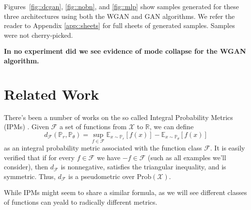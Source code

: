 \documentclass{article} %
\newcommand\EE{\mathbb{E}}
\newcommand\PP{\mathbb{P}}
\newcommand\RR{\mathbb{R}}
\theoremstyle{definition}
\theoremstyle{definition}
\newcommand\manX{\mathcal{X}}
\newcommand\manF{\mathcal{F}}
\begin{document}
Figures~\ref{fig::dcgan}, \ref{fig::nobn}, and \ref{fig::mlp} show
samples generated for these three architectures using both the WGAN
and GAN algorithms. We refer the reader to Appendix
\autoref{app::sheets} for full sheets of generated samples.
Samples were not cherry-picked.

\textbf{In no experiment did we see evidence of mode collapse for the WGAN algorithm.}



\section{Related Work}
\label{sec-related}
There's been a number of works on the so called
Integral Probability Metrics (IPMs) \cite{Muller-IPM}.
Given $\manF$ a set of functions from $\mathcal{X}$
to $\RR$, we can define
\begin{equation} \label{eq::IPM}
  d_\manF(\PP_r, \PP_\theta) = \sup_{f \in \manF} \EE_{x \sim \PP_r}[f(x)] - \EE_{x \sim \PP_\theta}[f(x)]
\end{equation}
as an integral probability metric associated with the
function class $\manF$. It is easily verified that
if for every $f \in \manF$ we have $-f \in \manF$
(such as all examples we'll consider), then
$d_\manF$ is nonnegative, satisfies the triangular
inequality, and is symmetric. Thus, $d_\manF$ is
a pseudometric over $\text{Prob}(\manX)$.

While IPMs might seem to share a similar formula,
as we will see different classes of functions
can yeald to radically different metrics.
\end{document}

